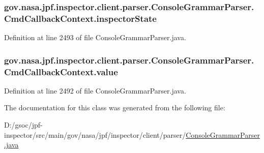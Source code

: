 \subsubsection[{\texorpdfstring{inspector\+State}{inspectorState}}]{ gov.\+nasa.\+jpf.\+inspector.\+client.\+parser.\+Console\+Grammar\+Parser.\+Cmd\+Callback\+Context.\+inspector\+State}\hypertarget{classgov_1_1nasa_1_1jpf_1_1inspector_1_1client_1_1parser_1_1_console_grammar_parser_1_1_cmd_callback_context_aa6cce69dfc80b3323df9017104afba70}{}\label{classgov_1_1nasa_1_1jpf_1_1inspector_1_1client_1_1parser_1_1_console_grammar_parser_1_1_cmd_callback_context_aa6cce69dfc80b3323df9017104afba70}


Definition at line 2493 of file Console\+Grammar\+Parser.\+java.

\subsubsection[{\texorpdfstring{value}{value}}]{ gov.\+nasa.\+jpf.\+inspector.\+client.\+parser.\+Console\+Grammar\+Parser.\+Cmd\+Callback\+Context.\+value}\hypertarget{classgov_1_1nasa_1_1jpf_1_1inspector_1_1client_1_1parser_1_1_console_grammar_parser_1_1_cmd_callback_context_a3af191afae22a2516c97691be7eb9e9c}{}\label{classgov_1_1nasa_1_1jpf_1_1inspector_1_1client_1_1parser_1_1_console_grammar_parser_1_1_cmd_callback_context_a3af191afae22a2516c97691be7eb9e9c}


Definition at line 2492 of file Console\+Grammar\+Parser.\+java.



The documentation for this class was generated from the following file\+:\begin{DoxyCompactItemize}
\item 
D\+:/gsoc/jpf-\/inspector/src/main/gov/nasa/jpf/inspector/client/parser/\hyperlink{_console_grammar_parser_8java}{Console\+Grammar\+Parser.\+java}\end{DoxyCompactItemize}
